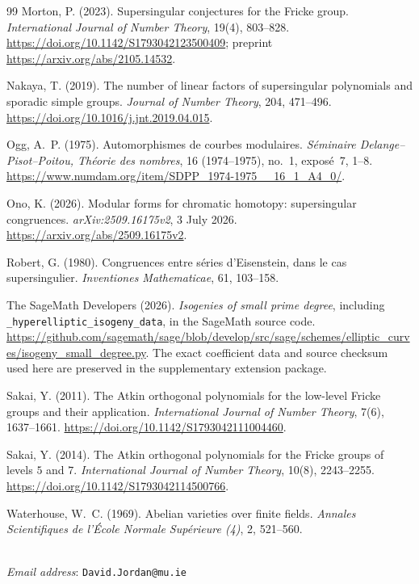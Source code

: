 \documentclass[11pt,a4paper]{article}
\numberwithin{equation}{section}
\theoremstyle{definition}
\theoremstyle{remark}
\begin{document}
\begin{thebibliography}{99}
 Morton, P. (2023). Supersingular conjectures for the
Fricke group. \emph{International Journal of Number Theory}, 19(4), 803--828.
\url{https://doi.org/10.1142/S1793042123500409}; preprint
\url{https://arxiv.org/abs/2105.14532}.

 Nakaya, T. (2019). The number of linear factors of
supersingular polynomials and sporadic simple groups. \emph{Journal of Number Theory},
204, 471--496. \url{https://doi.org/10.1016/j.jnt.2019.04.015}.

 Ogg, A.~P. (1975).
Automorphismes de courbes modulaires.
\emph{S\'eminaire Delange--Pisot--Poitou, Th\'eorie des nombres},
16 (1974--1975), no.~1, expos\'e~7, 1--8.
\url{https://www.numdam.org/item/SDPP_1974-1975__16_1_A4_0/}.

 Ono, K. (2026). Modular forms for chromatic homotopy: supersingular congruences. \emph{arXiv:2509.16175v2}, 3 July 2026. \url{https://arxiv.org/abs/2509.16175v2}.

 Robert, G. (1980). Congruences entre s\'eries d'Eisenstein, dans le cas supersingulier. \emph{Inventiones Mathematicae}, 61, 103--158.

 The SageMath Developers (2026).
\emph{Isogenies of small prime degree}, including
\texttt{\_hyperelliptic\_isogeny\_data}, in the SageMath source code.
\url{https://github.com/sagemath/sage/blob/develop/src/sage/schemes/elliptic_curves/isogeny_small_degree.py}.
The exact coefficient data and source checksum used here are preserved
in the supplementary extension package.

 Sakai, Y. (2011). The Atkin orthogonal polynomials for
the low-level Fricke groups and their application.
\emph{International Journal of Number Theory}, 7(6), 1637--1661.
\url{https://doi.org/10.1142/S1793042111004460}.

 Sakai, Y. (2014). The Atkin orthogonal polynomials for
the Fricke groups of levels $5$ and $7$.
\emph{International Journal of Number Theory}, 10(8), 2243--2255.
\url{https://doi.org/10.1142/S1793042114500766}.

 Waterhouse, W.~C. (1969). Abelian varieties over finite fields. \emph{Annales Scientifiques de l'\'Ecole Normale Sup\'erieure (4)}, 2, 521--560.
\end{thebibliography}
	\bigskip
{}\\
\emph{Email address}: \texttt{David.Jordan@mu.ie}
\end{document}
